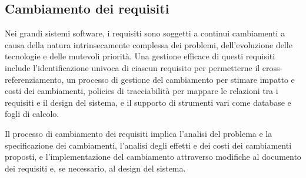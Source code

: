 \subsection{Cambiamento dei requisiti}

Nei grandi sistemi software, i requisiti sono soggetti a continui cambiamenti
a causa della natura intrinsecamente complessa dei problemi, dell'evoluzione delle
tecnologie e delle mutevoli priorità. Una gestione efficace di questi requisiti
include l'identificazione univoca di ciascun requisito per permetterne il
cross-referenziamento, un processo di gestione del cambiamento per stimare impatto
e costi dei cambiamenti, policies di tracciabilità per mappare le relazioni tra i
requisiti e il design del sistema, e il supporto di strumenti vari come database
e fogli di calcolo.

Il processo di cambiamento dei requisiti implica l'analisi del problema e la
specificazione dei cambiamenti, l'analisi degli effetti e dei costi dei cambiamenti
proposti, e l'implementazione del cambiamento attraverso modifiche al documento dei
requisiti e, se necessario, al design del sistema.
